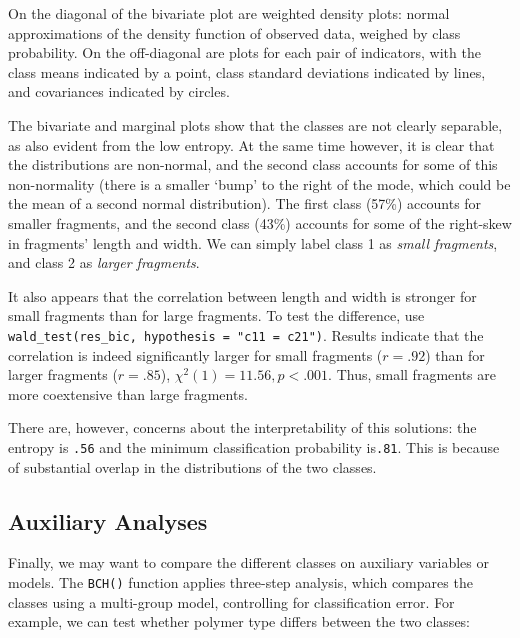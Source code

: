 \documentclass[
  man,floatsintext]{apa6}
\newenvironment{Shaded}{\begin{snugshade}}{\end{snugshade}}
\newcommand{\AttributeTok}[1]{\textcolor[rgb]{0.77,0.63,0.00}{#1}}
\newcommand{\FunctionTok}[1]{\textcolor[rgb]{0.00,0.00,0.00}{#1}}
\newcommand{\NormalTok}[1]{#1}
\newcommand{\OtherTok}[1]{\textcolor[rgb]{0.56,0.35,0.01}{#1}}
\newcommand{\SpecialCharTok}[1]{\textcolor[rgb]{0.00,0.00,0.00}{#1}}
\newcommand{\StringTok}[1]{\textcolor[rgb]{0.31,0.60,0.02}{#1}}
\begin{document}
On the diagonal of the bivariate plot are weighted density plots: normal approximations of the density function of observed data, weighed by class probability.
On the off-diagonal are plots for each pair of indicators, with the class means indicated by a point, class standard deviations indicated by lines, and covariances indicated by circles.

The bivariate and marginal plots show that the classes are not clearly separable, as also evident from the low entropy.
At the same time however, it is clear that the distributions are non-normal, and the second class accounts for some of this non-normality (there is a smaller `bump' to the right of the mode, which could be the mean of a second normal distribution).
The first class (57\%) accounts for smaller fragments, and the second class (43\%) accounts for some of the right-skew in fragments' length and width.
We can simply label class 1 as \emph{small fragments}, and class 2 as \emph{larger fragments}.

It also appears that the correlation between length and width is stronger for small fragments than for large fragments.
To test the difference, use \texttt{wald\_test(res\_bic,\ hypothesis\ =\ "c11\ =\ c21")}.
Results indicate that the correlation is indeed significantly larger for small fragments (\(r = .92\)) than for larger fragments (\(r = .85\)), \(\chi^2(1) = 11.56, p < .001\).
Thus, small fragments are more coextensive than large fragments.

There are, however, concerns about the interpretability of this solutions: the entropy is \texttt{.56} and the minimum classification probability is\texttt{.81}.
This is because of substantial overlap in the distributions of the two classes.

\hypertarget{auxiliary-analyses}{%
\subsection{Auxiliary Analyses}\label{auxiliary-analyses}}

Finally, we may want to compare the different classes on auxiliary variables or models.
The \texttt{BCH()} function applies three-step analysis, which compares the classes using a multi-group model, controlling for classification error.
For example, we can test whether polymer type differs between the two classes:

\begin{Shaded}
\end{Shaded}
\end{document}
